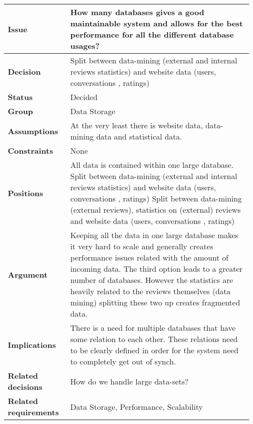 
\begin{tabular}{ l  p{10cm}}
\hline
\bf Issue & How many databases gives a good maintainable system and allows for the best performance for all the different database usages?\\
\hline
\bf Decision & Split between data-mining (external and internal reviews statistics) and website data (users, conversations , ratings)\\
\hline
\bf Status & Decided\\
\hline
\bf Group & Data Storage \\
\hline
\bf Assumptions & At the very least there is website data, data-mining data and statistical data.\\
\hline
\bf Constraints & None \\
\hline
\bf Positions & All data is contained within one large database. \newline\newline
Split between data-mining (external and internal reviews statistics) and website data (users, conversations , ratings)  \newline\newline
Split between data-mining (external reviews), statistics on (external) reviews and website data (users, conversations , ratings)
 \\
\hline
\bf Argument & Keeping all the data in one large database makes it very hard to scale and generally creates performance issues related with the amount of incoming data. 
The third option leads to a greater number of databases. However the statistics are heavily related to the reviews themselves (data mining) splitting these two up creates fragmented data. 
 \\
\hline
\bf Implications & There is a need for multiple databases that have some relation to each other. These relations need to be clearly defined in order for the system need to completely get out of synch. \\
\hline
\bf Related decisions & How do we handle large data-sets? \\
\hline
\bf Related requirements  & Data Storage, Performance, Scalability\\
\hline
\end{tabular}
